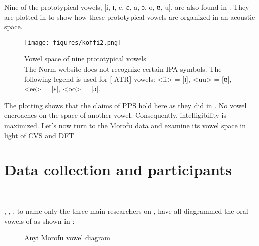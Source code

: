 \documentclass[output=paper,
modfonts
]{langscibook}
\begin{document}
{Nine of the prototypical vowels, [i, ɪ, e, ɛ, a, ɔ, o,} {ʊ}{, u], are also found in . They are plotted in  to show how these prototypical vowels are organized in an acoustic space.}


  
\begin{figure}
\texttt{[image: figures/koffi2.png]}
\caption[Vowel space of nine prototypical vowels]{Vowel space of nine prototypical vowels\\
The Norm website does not recognize certain IPA symbols.  
The following legend is used for [-ATR] vowels: 
<ii> = [ɪ],  
<uu> = [ʊ],
<ee> = [ɛ], 
<oo> = [ɔ].}  

\label{fig:koffi:2}
\end{figure}

{The plotting shows that the claims of PPS hold here as they did in . No vowel encroaches on the space of another vowel. Consequently, intelligibility is maximized. Let’s now turn to the  Morofu data and examine its vowel space in light of CVS and DFT.} 

\section{Data collection and participants}
~

{\citet{Koffi2009}, \citet[27]{Quaireau1987}, \citet[96]{Retord1980}, to name only the three main researchers on , have all diagrammed the oral vowels of  as shown in :}


\begin{figure}
% 
% 
% 
% 
% 
% 

\caption{Anyi Morofu vowel diagram}
\label{fig:koffi:3}
\end{figure}
\end{document}
